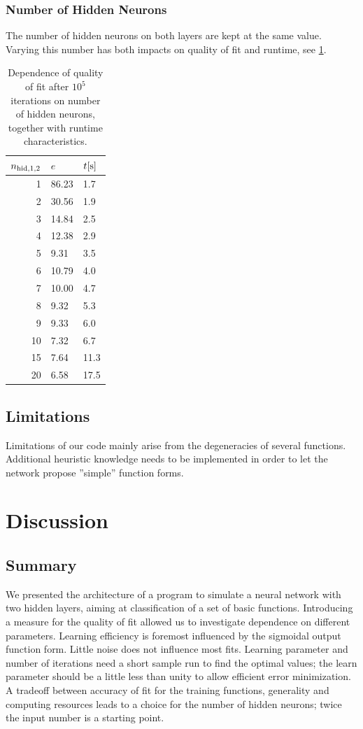 \documentclass[useAMS,usenatbib]{templates/mn2e}
\begin{document}
\subsubsection{Number of Hidden Neurons}
The number of hidden neurons on both layers are kept at the same
value. Varying this number has both impacts on quality of fit and
runtime, see \ref{tab:run}.
\begin{table}
\begin{center}
\begin{tabular}{rll}\hline\hline
$n_{{\rm hid,1,2}}$&$e$&$t[{\rm s}]$\\
\hline
 1&86.23& 1.7\\
 2&30.56& 1.9\\
 3&14.84& 2.5\\
 4&12.38& 2.9\\
 5& 9.31& 3.5\\
 6&10.79& 4.0\\
 7&10.00& 4.7\\
 8& 9.32& 5.3\\
 9& 9.33& 6.0\\
10& 7.32& 6.7\\
\hline
15& 7.64&11.3\\
\hline
20& 6.58&17.5\\
\hline
\end{tabular}
\end{center}
\caption{\label{tab:run}Dependence of quality of fit after $10^5$ iterations on number of hidden neurons, together with runtime characteristics.}
\end{table}
%
\subsection{Limitations}
Limitations of our code mainly arise from the degeneracies of several
functions. Additional heuristic knowledge needs to be implemented in
order to let the network propose ''simple'' function forms.
%
\section{Discussion}
\label{sec:Discussion}
%
%
\subsection{Summary}
We presented the architecture of a program to simulate a neural
network with two hidden layers, aiming at classification of a set of
basic functions. Introducing a measure for the quality of fit allowed
us to investigate dependence on different parameters. Learning
efficiency is foremost influenced by the sigmoidal output function
form. Little noise does not influence most fits. Learning parameter
and number of iterations need a short sample run to find the optimal
values; the learn parameter should be a little less than unity to
allow efficient error minimization. A tradeoff between accuracy of fit
for the training functions, generality and computing resources leads
to a choice for the number of hidden neurons; twice the input number
is a starting point.
%
%
\end{document}
